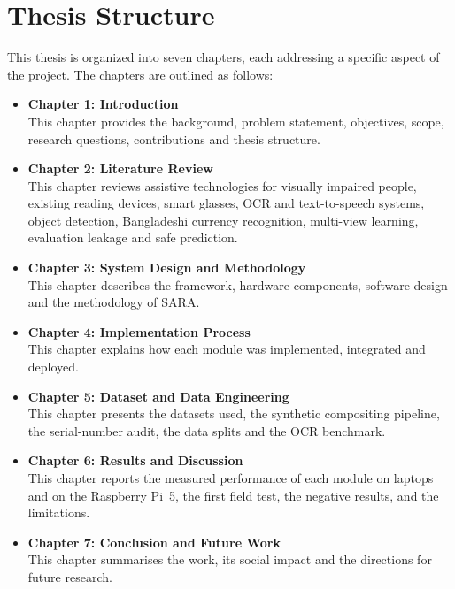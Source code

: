 \section{Thesis Structure}

This thesis is organized into seven chapters, each addressing a specific aspect of the project. The chapters are outlined as follows:

\begin{itemize}
    \item \textbf{Chapter 1: Introduction} \\
    This chapter provides the background, problem statement, objectives, scope, research questions, contributions and thesis structure.

    \item \textbf{Chapter 2: Literature Review} \\
    This chapter reviews assistive technologies for visually impaired people, existing reading devices, smart glasses, OCR and text-to-speech systems, object detection, Bangladeshi currency recognition, multi-view learning, evaluation leakage and safe prediction.

    \item \textbf{Chapter 3: System Design and Methodology} \\
    This chapter describes the framework, hardware components, software design and the methodology of SARA.

    \item \textbf{Chapter 4: Implementation Process} \\
    This chapter explains how each module was implemented, integrated and deployed.

    \item \textbf{Chapter 5: Dataset and Data Engineering} \\
    This chapter presents the datasets used, the synthetic compositing pipeline, the serial-number audit, the data splits and the OCR benchmark.

    \item \textbf{Chapter 6: Results and Discussion} \\
    This chapter reports the measured performance of each module on laptops and on the Raspberry Pi~5, the first field test, the negative results, and the limitations.

    \item \textbf{Chapter 7: Conclusion and Future Work} \\
    This chapter summarises the work, its social impact and the directions for future research.
\end{itemize}
